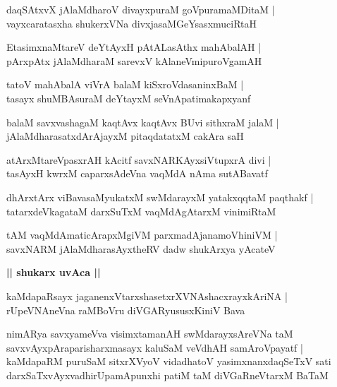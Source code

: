 \documentclass[twoside,12pt,openright]{book}
\newcounter{shloka}[chapter]
\def\uvaca#1{\centerline{{\large\textbf{#1}}}}
\begin{document}
\begin{shloka}%
daqSAtxvX jAlaMdharoV divayxpuraM goVpuramaMDitaM |\\
vayxcaratasxha shukerxVNa divxjasaMGeYsasxmuciRtaH
\end{shloka}

\begin{shloka}%
EtasimxnaMtareV deYtAyxH pAtALasAthx mahAbalAH |\\
pArxpAtx jAlaMdharaM sarevxV kAlaneVmipuroVgamAH 
\end{shloka}

\begin{shloka}%
tatoV mahAbalA viVrA balaM kiSxroVdasaninxBaM |\\
tasayx shuMBAsuraM deYtayxM seVnApatimakapxyanf
\end{shloka}

\begin{shloka}%
balaM savxvashagaM kaqtAvx kaqtAvx BUvi sithxraM jalaM |\\
jAlaMdharasatxdArAjayxM pitaqdatatxM cakAra saH 
\end{shloka}

\begin{shloka}%
atArxMtareVpasxrAH kAcitf savxNARKAyxsiVtupxrA divi |\\
tasAyxH kwrxM caparxsAdeVna vaqMdA nAma sutABavatf 
\end{shloka}

\begin{shloka}%
dhArxtArx viBavasaMyukatxM swMdarayxM yatakxqqtaM paqthakf |\\
tatarxdeVkagataM darxSuTxM vaqMdAgAtarxM vinimiRtaM 
\end{shloka}

\begin{shloka}%
tAM vaqMdAmaticArapxMgiVM parxmadAjanamoVhiniVM |\\
savxNARM jAlaMdharasAyxtheRV dadw shukArxya yAcateV 
\end{shloka}

\uvaca{|| shukarx uvAca ||}

\begin{shloka}%
kaMdapaRsayx jaganenxVtarxshasetxrXVNAshacxrayxkAriNA |\\
rUpeVNAneVna raMBoVru diVGARyususxKiniV Bava
\end{shloka}

\begin{shloka}%
nimARya savxyameVva visimxtamanAH swMdarayxsAreVNa taM \\
savxvAyxpAraparisharxmasayx kaluSaM veVdhAH samAroVpayatf |\\
kaMdapaRM puruSaM sitxrXVyoV vidadhatoV yasimxnanxdaqSeTxV sati\\
darxSaTxvAyxvadhirUpamApunxhi patiM taM diVGaRneVtarxM BaTaM 
\end{shloka}
\end{document}
